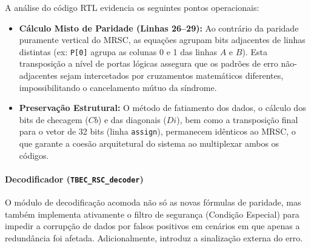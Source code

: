 \documentclass[12pt,a4paper]{article}
\begin{document}
A análise do código RTL evidencia os seguintes pontos operacionais:
\begin{itemize}
    \item \textbf{Cálculo Misto de Paridade (Linhas 26–29):} Ao contrário da paridade puramente vertical do MRSC, as equações agrupam bits adjacentes de linhas distintas (ex: \texttt{P[0]} agrupa as colunas 0 e 1 das linhas $A$ e $B$). Esta transposição a nível de portas lógicas assegura que os padrões de erro não-adjacentes sejam intercetados por cruzamentos matemáticos diferentes, impossibilitando o cancelamento mútuo da síndrome.
    \item \textbf{Preservação Estrutural:} O método de fatiamento dos dados, o cálculo dos bits de checagem ($Cb$) e das diagonais ($Di$), bem como a transposição final para o vetor de 32 bits (linha \texttt{assign}), permanecem idênticos ao MRSC, o que garante a coesão arquitetural do sistema ao multiplexar ambos os códigos.
\end{itemize}

\paragraph{Decodificador (\texttt{TBEC\_RSC\_decoder})}

O módulo de decodificação acomoda não só as novas fórmulas de paridade, mas também implementa ativamente o filtro de segurança (Condição Especial) para impedir a corrupção de dados por falsos positivos em cenários em que apenas a redundância foi afetada. Adicionalmente, introduz a sinalização externa do erro.
\end{document}
